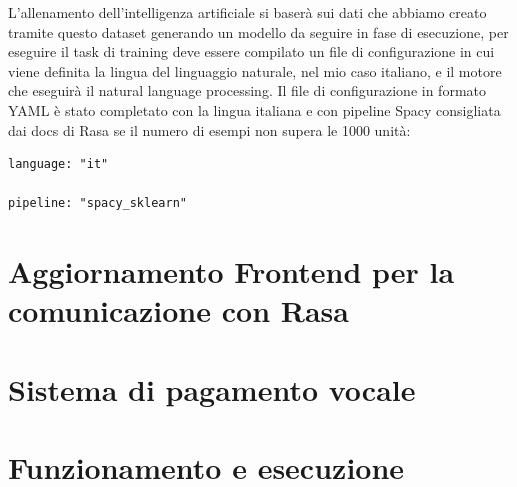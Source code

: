L'allenamento dell'intelligenza artificiale si baserà sui dati che abbiamo creato tramite questo dataset generando un modello da seguire in fase di esecuzione, per eseguire il task di training deve essere compilato un file di configurazione in cui viene definita la lingua del linguaggio naturale, nel mio caso italiano, e il motore che eseguirà il natural language processing.
Il file di configurazione in formato YAML è stato completato con la lingua italiana e con pipeline Spacy consigliata dai docs di Rasa se il numero di esempi non supera le 1000 unità:
\begin{lstlisting}
language: "it"

pipeline: "spacy_sklearn"
\end{lstlisting}

\section{Aggiornamento Frontend per la comunicazione con Rasa}

\section{Sistema di pagamento vocale}

\section{Funzionamento e esecuzione}

